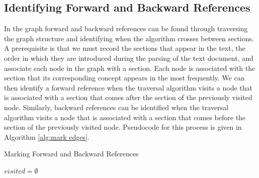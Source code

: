 \documentclass[12pt]{article}
\theoremstyle{grammarstyle}
\begin{document}

\subsection{Identifying Forward and Backward References}
In the graph forward and backward references can be found through traversing the graph structure and identifying when the algorithm crosses between sections. A prerequisite is that we must record the sections that appear in the text, the order in which they are introduced during the parsing of the text document, and associate each node in the graph with a section. Each node is associated with the section that its corresponding concept appears in the most frequently.  We can then identify a forward reference when the traversal algorithm visits a node that is associated with a section that comes after the section of the previously visited node. Similarly, backward references can be identified when the traversal algorithm visits a node that is associated with a section that comes before the section of the previously visited node. Pseudocode for this process is given in Algorithm \ref{alg:mark edges}.

\DontPrintSemicolon

\begin{algorithm*}
    \caption{Marking Forward and Backward References}
    \label{alg:mark edges}
    \;
    $visited = \emptyset$\;
    \;
    \;
\end{algorithm*}
\end{document}
